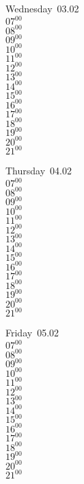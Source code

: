 \documentclass[11pt,a4paper]{book}\usepackage[]{graphicx}\usepackage[]{color}
\begin{document}
\begin{weekdaybox}
  Wednesday~03.02\\
  { 
  \vfill
  $07^{00}$\\
$08^{00}$\\
$09^{00}$\\
$10^{00}$\\
$11^{00}$\\
$12^{00}$\\
$13^{00}$\\
$14^{00}$\\
$15^{00}$\\
$16^{00}$\\
$17^{00}$\\
$18^{00}$\\
$19^{00}$\\
$20^{00}$\\
$21^{00}$\\
  }
\end{weekdaybox}
\clearpage
\begin{headerbox}
\end{headerbox}
\begin{weekdaybox}
  Thursday~04.02\\
  { 
  \vfill
  $07^{00}$\\
$08^{00}$\\
$09^{00}$\\
$10^{00}$\\
$11^{00}$\\
$12^{00}$\\
$13^{00}$\\
$14^{00}$\\
$15^{00}$\\
$16^{00}$\\
$17^{00}$\\
$18^{00}$\\
$19^{00}$\\
$20^{00}$\\
$21^{00}$\\
  }
\end{weekdaybox} 
\begin{weekdaybox}
  Friday~05.02\\
  { 
  \vfill
  $07^{00}$\\
$08^{00}$\\
$09^{00}$\\
$10^{00}$\\
$11^{00}$\\
$12^{00}$\\
$13^{00}$\\
$14^{00}$\\
$15^{00}$\\
$16^{00}$\\
$17^{00}$\\
$18^{00}$\\
$19^{00}$\\
$20^{00}$\\
$21^{00}$\\
  }
\end{weekdaybox}
\end{document}
